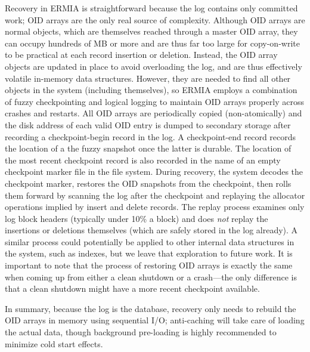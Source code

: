 Recovery in ERMIA is straightforward because the log contains only committed work; OID arrays are the only real source of complexity. Although OID arrays are normal objects, which are themselves reached through a master OID array, they can occupy hundreds of MB or more and are thus far too large for copy-on-write to be practical at each record insertion or deletion. Instead, the OID array objects are updated in place to avoid overloading the log, and are thus effectively volatile in-memory data structures. However, they are needed to find all other objects in the system (including themselves), so ERMIA employs a combination of fuzzy checkpointing and logical logging to maintain OID arrays properly across crashes and restarts. All OID arrays are periodically copied (non-atomically) and the disk address of each valid OID entry is dumped to secondary storage after recording a checkpoint-begin record in the log. A checkpoint-end record records the location of a the fuzzy snapshot once the latter is durable. The location of the most recent checkpoint record is also recorded in the name of an empty checkpoint marker file in the file system. During recovery, the system decodes the checkpoint marker, restores the OID snapshots from the checkpoint, then rolls them forward by scanning the log after the checkpoint and replaying the allocator operations implied by insert and delete records. The replay process examines only log block headers (typically under 10\% a block) and does {\em not} replay the insertions or deletions themselves (which are safely stored in the log already). A similar process could potentially be applied to other internal data structures in the system, such as indexes, but we leave that exploration to future work. It is important to note that the process of restoring OID arrays is exactly the same when coming up from either a clean shutdown or a crash---the only difference is that a clean shutdown might have a more recent checkpoint available.

In summary, because the log is the database, recovery only needs to rebuild the OID arrays in memory using sequential I/O; anti-caching will take care of loading the actual data, though background pre-loading is highly recommended to minimize cold start effects.

%

